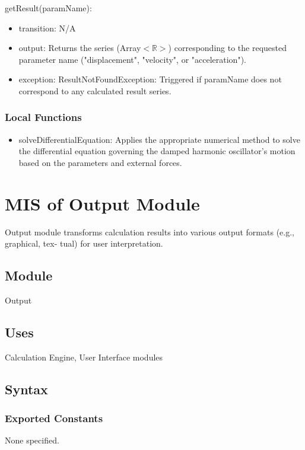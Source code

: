 \documentclass[12pt, titlepage]{article}
\begin{document}
\noindent getResult(paramName):
\begin{itemize}
\item transition: N/A
\item output: Returns the series (Array$<\mathbb{R}>$) corresponding to the requested parameter name ("displacement", "velocity", or "acceleration").
\item exception: ResultNotFoundException: Triggered if paramName does not correspond to any calculated result series.
\end{itemize}

\subsubsection{Local Functions}

\begin{itemize}
  \item solveDifferentialEquation: Applies the appropriate numerical method to solve the differential equation governing the damped harmonic oscillator's motion based on the parameters and external forces.
\end{itemize}



\section{MIS of Output Module} \label{mOM}

Output module transforms calculation results into various output formats (e.g., graphical, tex-
tual) for user interpretation.

\subsection{Module}
Output

\subsection{Uses}
Calculation Engine, User Interface modules

\subsection{Syntax}

\subsubsection{Exported Constants}
None specified.
\end{document}
